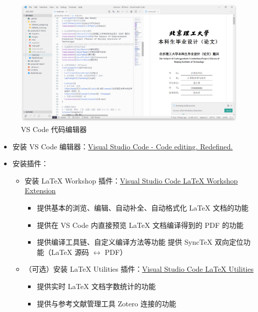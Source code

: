 \begin{figure}[H]
  \centering
  \includegraphics[width=\textwidth]{images/vscode.png}
  \caption{VS Code 代码编辑器}
\end{figure}

\begin{itemize}
  \item 安装 VS Code 编辑器：\href{https://code.visualstudio.com/}{Visual Studio Code - Code editing. Redefined.}
  \item 安装插件：
  \begin{itemize}
    \item 安装 {\LaTeX} Workshop 插件：\href{https://marketplace.visualstudio.com/items?itemName=James-Yu.latex-workshop}{Visual Studio Code LaTeX Workshop Extension}
    \begin{itemize}
      \item 提供基本的浏览、编辑、自动补全、自动格式化 {\LaTeX} 文档的功能
      \item 提供在 VS Code 内直接预览 {\LaTeX} 文档编译得到的 PDF 的功能
      \item 提供编译工具链、自定义编译方法等功能
      提供 SyncTeX 双向定位功能（{\LaTeX} 源码 $\longleftrightarrow$ PDF）

    \end{itemize}
    \item （可选）安装 {\LaTeX} Utilities 插件：\href{https://marketplace.visualstudio.com/items?itemName=tecosaur.latex-utilities}{Visual Studio Code LaTeX Utilities}
    \begin{itemize}
      \item 提供实时 {\LaTeX} 文档字数统计的功能
      \item 提供与参考文献管理工具 Zotero 连接的功能
    \end{itemize}
  \end{itemize}
\end{itemize}

